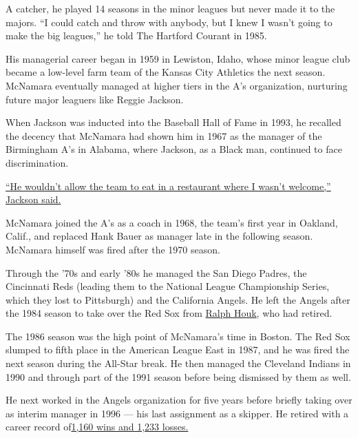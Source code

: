 A catcher, he played 14 seasons in the minor leagues but never made it
to the majors. ``I could catch and throw with anybody, but I knew I
wasn't going to make the big leagues,'' he told The Hartford Courant in
1985.

His managerial career began in 1959 in Lewiston, Idaho, whose minor
league club became a low-level farm team of the Kansas City Athletics
the next season. McNamara eventually managed at higher tiers in the A's
organization, nurturing future major leaguers like Reggie Jackson.

When Jackson was inducted into the Baseball Hall of Fame in 1993, he
recalled the decency that McNamara had shown him in 1967 as the manager
of the Birmingham A's in Alabama, where Jackson, as a Black man,
continued to face discrimination.

\href{https://www.baltimoresun.com/news/bs-xpm-1993-08-02-1993214108-story.html}{``He
wouldn't allow the team to eat in a restaurant where I wasn't welcome,''
Jackson said.}

McNamara joined the A's as a coach in 1968, the team's first year in
Oakland, Calif., and replaced Hank Bauer as manager late in the
following season. McNamara himself was fired after the 1970 season.

Through the '70s and early '80s he managed the San Diego Padres, the
Cincinnati Reds (leading them to the National League Championship
Series, which they lost to Pittsburgh) and the California Angels. He
left the Angels after the 1984 season to take over the Red Sox from
\href{https://www.nytimes3xbfgragh.onion/2010/07/22/sports/baseball/22Houk.html\#:~:text=Ralph\%20Houk\%2C\%20Yankees\%20Manager\%2C\%20Dies\%20at\%2090,-By\%20Richard\%20Goldstein\&text=Ralph\%20Houk\%2C\%20a\%20third\%2Dstring,He\%20was\%2090.\&text=\%E2\%80\%9CI'm\%20Ralph\%20Houk.\%E2\%80\%9D}{Ralph
Houk}, who had retired.

The 1986 season was the high point of McNamara's time in Boston. The Red
Sox slumped to fifth place in the American League East in 1987, and he
was fired the next season during the All-Star break. He then managed the
Cleveland Indians in 1990 and through part of the 1991 season before
being dismissed by them as well.

He next worked in the Angels organization for five years before briefly
taking over as interim manager in 1996 --- his last assignment as a
skipper. He retired with a career record
of\href{https://www.baseball-reference.com/managers/mcnamjo99.shtml}{1,160
wins and 1,233 losses.}

